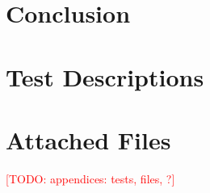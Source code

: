 \documentclass[a4paper]{IEEEtran}
\newcommand\todo[1]{\textcolor{red}{[TODO: #1]}}
\begin{document}
\section{Conclusion}
    \label{sec:conclusion}
    

\appendices

\section{Test Descriptions}
    \label{sec:tests}
    

\section{Attached Files}
    \label{sec:files}
    




\todo{appendices: tests, files, ?}
\end{document}

